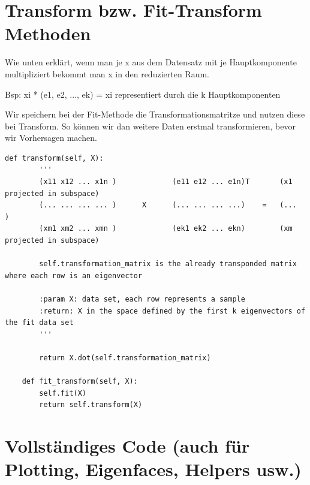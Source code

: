 \section*{Transform bzw. Fit-Transform Methoden}

Wie unten erklärt, wenn man je x aus dem Datensatz mit je Hauptkomponente multipliziert
bekommt man x in den reduzierten Raum.

Bsp: xi * (e1, e2, ..., ek) = xi representiert durch die k Hauptkomponenten

Wir speichern bei der Fit-Methode die Transformationsmatritze und nutzen diese bei Transform.
So können wir dan weitere Daten erstmal transformieren, bevor wir Vorhersagen machen.

\begin{lstlisting}[style=py]
    def transform(self, X):
        '''
        (x11 x12 ... x1n )             (e11 e12 ... e1n)T       (x1 projected in subspace)
        (... ... ... ... )      X      (... ... ... ...)    =   (...                     )
        (xm1 xm2 ... xmn )             (ek1 ek2 ... ekn)        (xm projected in subspace)

        self.transformation_matrix is the already transponded matrix where each row is an eigenvector

        :param X: data set, each row represents a sample
        :return: X in the space defined by the first k eigenvectors of the fit data set
        '''

        return X.dot(self.transformation_matrix)

    def fit_transform(self, X):
        self.fit(X)
        return self.transform(X)
\end{lstlisting}

\section*{Vollständiges Code (auch für Plotting, Eigenfaces, Helpers usw.)}

